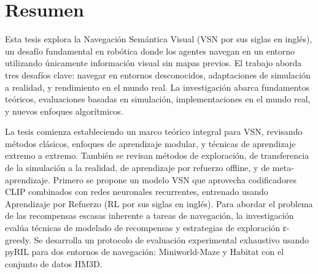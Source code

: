 %
%
%
% 
%
%
%
%

\chapter*{Resumen}
\label{cha:resumen}


Esta tesis explora la Navegación Semántica Visual (VSN por sus siglas en inglés), un desafío fundamental en robótica donde los agentes navegan en un entorno utilizando únicamente información visual sin mapas previos.
El trabajo aborda tres desafíos clave: navegar en entornos desconocidos, adaptaciones de simulación a realidad, y rendimiento en el mundo real.
La investigación abarca fundamentos teóricos, evaluaciones basadas en simulación, implementaciones en el mundo real, y nuevos enfoques algorítmicos.

La tesis comienza estableciendo un marco teórico integral para VSN, revisando métodos clásicos, enfoques de aprendizaje modular, y técnicas de aprendizaje extremo a extremo.
También se revisan métodos de exploración, de transferencia de la simulación a la realidad, de aprendizaje por refuerzo offline, y de meta-aprendizaje.
Primero se propone un modelo VSN que aprovecha codificadores CLIP combinados con redes neuronales recurrentes, entrenado usando Aprendizaje por Refuerzo (RL por sus siglas en inglés).
Para abordar el problema de las recompensas escasas inherente a tareas de navegación, la investigación evalúa técnicas de modelado de recompensas y estrategias de exploración ε-greedy.
Se desarrolla un protocolo de evaluación experimental exhaustivo usando pyRIL para dos entornos de navegación: Miniworld-Maze y Habitat con el conjunto de datos HM3D.

